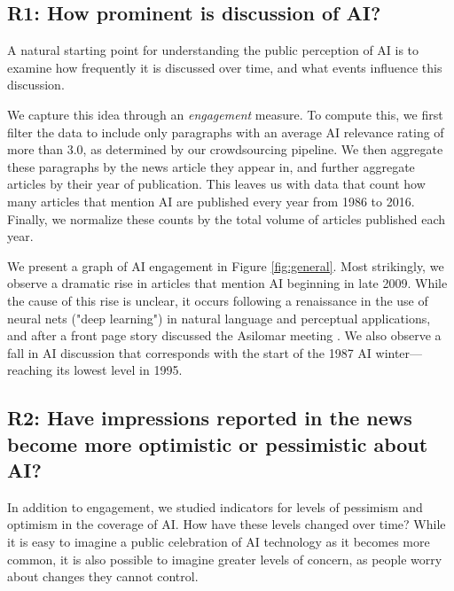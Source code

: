 \documentclass[letterpaper]{article}
\begin{document}
\subsection{R1: How prominent is discussion of AI?}

A natural starting point for understanding the public perception of AI is to examine how frequently it is discussed over time, and what events influence this discussion.

We capture this idea through an \textit{engagement} measure. To compute this, we first filter the data to include only paragraphs with an average AI relevance rating of more than 3.0, as determined by our crowdsourcing pipeline. We then aggregate these paragraphs by the news article they appear in, and further aggregate articles by their year of publication. This leaves us with data that count how many articles that mention AI are published every year from 1986 to 2016. Finally, we normalize these counts by the total volume of articles published each year. %

We present a graph of AI engagement in Figure \ref{fig:general}. Most strikingly, we observe a dramatic rise in articles that mention AI beginning in late 2009.  While the cause of this rise is unclear, it occurs following a renaissance in the use of neural nets ("deep learning") in natural language and perceptual applications, and after a front page story discussed the Asilomar meeting \cite{asilomar}. We also observe a fall in AI discussion that corresponds with the start of the 1987 AI winter---reaching its lowest level in 1995. %

\subsection{R2: Have impressions reported in the news become more optimistic or pessimistic about AI?}

In addition to engagement, we studied indicators for levels of pessimism and optimism in the coverage of AI. How have these levels changed over time? While it is easy to imagine a public celebration of AI technology as it becomes more common, it is also possible to imagine greater levels of concern, as people worry about changes they cannot control.
\end{document}
